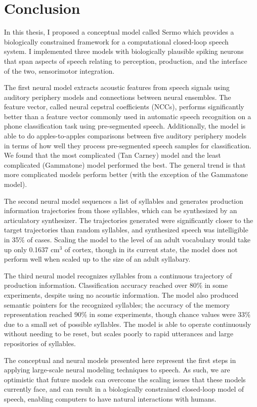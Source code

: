 \chapter{Conclusion}
\label{chapt:conclusion}

In this thesis,
I proposed a conceptual model
called Sermo which
provides a biologically constrained framework
for a computational closed-loop speech system.
I implemented three models
with biologically plausible spiking neurons
that span aspects of speech
relating to perception, production,
and the interface of the two,
sensorimotor integration.

The first neural model
extracts acoustic features
from speech signals
using auditory periphery models
and connections between neural ensembles.
The feature vector,
called neural cepstral coefficients (NCCs),
performs significantly better than
a feature vector commonly used
in automatic speech recognition
on a phone classification task
using pre-segmented speech.
Additionally, the model is able
to do apples-to-apples comparisons
between five auditory periphery models
in terms of how well they
process pre-segmented speech samples
for classification.
We found that the
most complicated (Tan Carney) model
and the least complicated (Gammatone) model
performed the best.
The general trend is that
more complicated models
perform better
(with the exception of the Gammatone model).

The second neural model
sequences a list of syllables
and generates production information trajectories
from those syllables,
which can be synthesized by an articulatory synthesizer.
The trajectories generated were
significantly closer
to the target trajectories than
random syllables,
and synthesized speech was intelligible
in 35\% of cases.
Scaling the model to the level of
an adult vocabulary would take up
only 0.1637 cm$^3$ of cortex,
though in its current state,
the model does not perform well
when scaled up
to the size of an adult syllabary.

The third neural model
recognizes syllables from a continuous
trajectory of production information.
Classification accuracy reached
over 80\% in some experiments,
despite using no acoustic information.
The model also produced semantic pointers
for the recognized syllables;
the accuracy of the memory representation
reached 90\% in some experiments,
though chance values were 33\% due to
a small set of possible syllables.
The model is able to operate continuously
without needing to be reset,
but scales poorly to rapid utterances
and large repositories of syllables.

The conceptual and neural models
presented here
represent the first steps
in applying large-scale neural modeling techniques
to speech.
As such, we are optimistic that
future models can overcome
the scaling issues that these models
currently face,
and can result in a biologically constrained
closed-loop model of speech,
enabling computers to
have natural interactions with humans.
